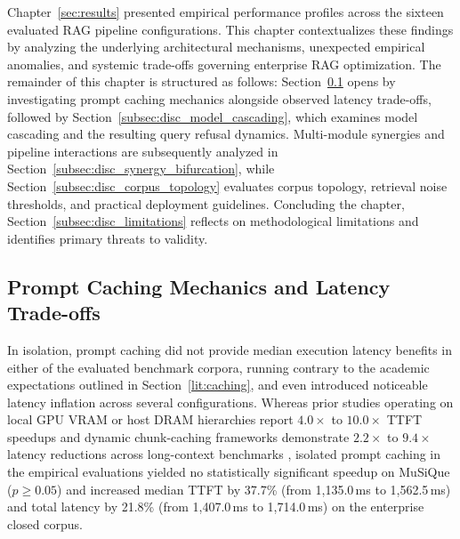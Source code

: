 Chapter~\ref{sec:results} presented empirical performance profiles across the sixteen evaluated RAG pipeline configurations. This chapter contextualizes these findings by analyzing the underlying architectural mechanisms, unexpected empirical anomalies, and systemic trade-offs governing enterprise RAG optimization. The remainder of this chapter is structured as follows: Section~\ref{subsec:disc_prompt_caching} opens by investigating prompt caching mechanics alongside observed latency trade-offs, followed by Section~\ref{subsec:disc_model_cascading}, which examines model cascading and the resulting query refusal dynamics. Multi-module synergies and pipeline interactions are subsequently analyzed in Section~\ref{subsec:disc_synergy_bifurcation}, while Section~\ref{subsec:disc_corpus_topology} evaluates corpus topology, retrieval noise thresholds, and practical deployment guidelines. Concluding the chapter, Section~\ref{subsec:disc_limitations} reflects on methodological limitations and identifies primary threats to validity.

\subsection{Prompt Caching Mechanics and Latency Trade-offs}
\label{subsec:disc_prompt_caching}

In isolation, prompt caching did not provide median execution latency benefits in either of the evaluated benchmark corpora, running contrary to the academic expectations outlined in Section~\ref{lit:caching}, and even introduced noticeable latency inflation across several configurations. Whereas prior studies operating on local GPU VRAM or host DRAM hierarchies report $4.0\times$ to $10.0\times$ TTFT speedups \citep{gim2024promptcache, jin2025ragcache} and dynamic chunk-caching frameworks demonstrate $2.2\times$ to $9.4\times$ latency reductions across long-context benchmarks \citep{lu2025turborag, yao2025cacheblend, wang2026fusionrag}, isolated prompt caching in the empirical evaluations yielded no statistically significant speedup on MuSiQue ($p \ge 0.05$) and increased median TTFT by 37.7\% (from 1,135.0\,ms to 1,562.5\,ms) and total latency by 21.8\% (from 1,407.0\,ms to 1,714.0\,ms) on the enterprise closed corpus.

